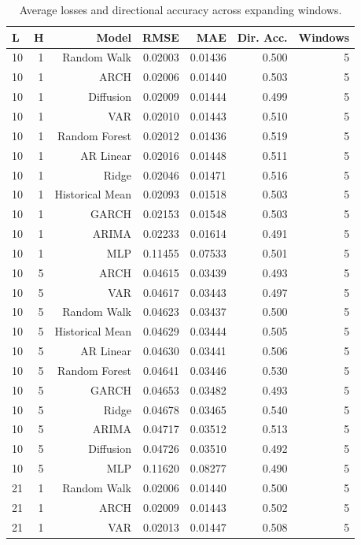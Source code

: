\begin{table}[!htbp]
\centering
\caption{Average losses and directional accuracy across expanding windows.}
\label{tab:model-performance-summary}
\begin{tabular}{lrrrrrr}
\toprule
L & H & Model & RMSE & MAE & Dir. Acc. & Windows \\
\midrule
10 & 1 & Random Walk & 0.02003 & 0.01436 & 0.500 & 5 \\
10 & 1 & ARCH & 0.02006 & 0.01440 & 0.503 & 5 \\
10 & 1 & Diffusion & 0.02009 & 0.01444 & 0.499 & 5 \\
10 & 1 & VAR & 0.02010 & 0.01443 & 0.510 & 5 \\
10 & 1 & Random Forest & 0.02012 & 0.01436 & 0.519 & 5 \\
10 & 1 & AR Linear & 0.02016 & 0.01448 & 0.511 & 5 \\
10 & 1 & Ridge & 0.02046 & 0.01471 & 0.516 & 5 \\
10 & 1 & Historical Mean & 0.02093 & 0.01518 & 0.503 & 5 \\
10 & 1 & GARCH & 0.02153 & 0.01548 & 0.503 & 5 \\
10 & 1 & ARIMA & 0.02233 & 0.01614 & 0.491 & 5 \\
10 & 1 & MLP & 0.11455 & 0.07533 & 0.501 & 5 \\
10 & 5 & ARCH & 0.04615 & 0.03439 & 0.493 & 5 \\
10 & 5 & VAR & 0.04617 & 0.03443 & 0.497 & 5 \\
10 & 5 & Random Walk & 0.04623 & 0.03437 & 0.500 & 5 \\
10 & 5 & Historical Mean & 0.04629 & 0.03444 & 0.505 & 5 \\
10 & 5 & AR Linear & 0.04630 & 0.03441 & 0.506 & 5 \\
10 & 5 & Random Forest & 0.04641 & 0.03446 & 0.530 & 5 \\
10 & 5 & GARCH & 0.04653 & 0.03482 & 0.493 & 5 \\
10 & 5 & Ridge & 0.04678 & 0.03465 & 0.540 & 5 \\
10 & 5 & ARIMA & 0.04717 & 0.03512 & 0.513 & 5 \\
10 & 5 & Diffusion & 0.04726 & 0.03510 & 0.492 & 5 \\
10 & 5 & MLP & 0.11620 & 0.08277 & 0.490 & 5 \\
21 & 1 & Random Walk & 0.02006 & 0.01440 & 0.500 & 5 \\
21 & 1 & ARCH & 0.02009 & 0.01443 & 0.502 & 5 \\
21 & 1 & VAR & 0.02013 & 0.01447 & 0.508 & 5 \\

\end{tabular}
\end{table}
